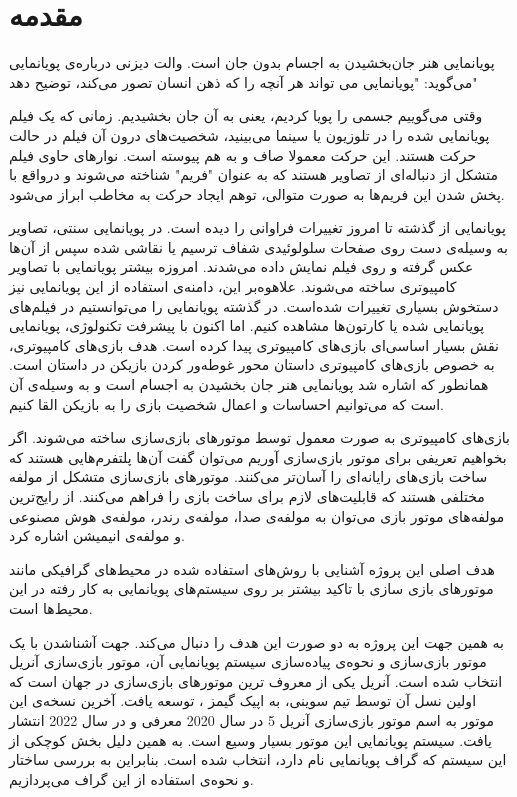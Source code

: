 \chapter{مقدمه}






پویانمایی هنر جان‌بخشیدن به اجسام بدون جان است.
والت دیزنی درباره‌‌ی پویانمایی می‌گوید: "پویانمایی می تواند هر آنچه را که ذهن انسان تصور می‌کند، توضیح دهد"

وقتی می‌گوییم جسمی را پویا کردیم، یعنی به آن جان بخشیدیم.
زمانی که یک فیلم پویانمایی شده را در تلوزیون یا سینما می‌بینید، شخصیت‌های درون آن فیلم در حالت حرکت هستند.
این حرکت معمولا صاف و به هم پیوسته است. نوارهای حاوی فیلم متشکل از دنباله‌ای از تصاویر هستند که به عنوان "فریم" شناخته می‌شوند و درواقع با پخش شدن این فریم‌ها
به صورت متوالی، توهم ایجاد حرکت به مخاطب ابراز می‌شود.

پویانمایی از گذشته تا امروز تغییرات فراوانی را دیده است.
در پویانمایی سنتی، تصاویر به وسیله‌‌ی دست روی صفحات سلولوئیدی شفاف ترسیم یا نقاشی شده 
سپس از آن‌ها عکس گرفته و روی فیلم نمایش داده می‌شدند.
امروزه بیشتر پویانمایی با تصاویر کامپیوتری
ساخته می‌شوند.
علاهوه‌بر این، دامنه‌ی استفاده از این پویانمایی نیز دستخوش بسیاری تغییرات شده‌است.
در گذشته پویانمایی را می‌توانستیم در فیلم‌های پویانمایی شده یا کارتون‌ها مشاهده کنیم.
اما اکنون با پیشرفت تکنولوژی، پویانمایی نقش بسیار اساسی‌ای بازی‌های کامپیوتری پیدا کرده است.
هدف بازی‌‌های کامپیوتری، به خصوص بازی‌های کامپیوتری داستان محور غوطه‌ور کردن بازیکن 
در داستان است.
همانطور که اشاره شد پویانمایی هنر جان بخشیدن به اجسام است و به وسیله‌ی 
آن است که می‌توانیم احساسات و اعمال شخصیت بازی را به بازیکن القا کنیم.

بازی‌های کامپیوتری به صورت معمول توسط موتور‌های بازی‌سازی ساخته می‌شوند.
اگر بخواهیم تعریفی برای موتور بازی‌سازی آوریم می‌توان گفت 
آن‌ها پلتفرم‌هایی هستند که ساخت بازی‌های رایانه‌ای را آسان‌تر می‌کنند.
موتور‌های بازی‌سازی متشکل از مولفه مختلفی هستند که قابلیت‌های لازم برای ساخت بازی را فراهم می‌کنند.
از رایج‌ترین مولفه‌های موتور بازی می‌توان به مولفه‌ی صدا، مولفه‌ی رندر، مولفه‌ی هوش مصنوعی و مولفه‌ی انیمیشن اشاره کرد.
\cite{barczak2019comparative}

هدف اصلی این پروژه آشنایی با روش‌های استفاده شده در محیط‌های گرافیکی مانند موتورهای بازی سازی با تاکید بیشتر بر 
روی سیستم‌های پویانمایی به کار رفته در این محیط‌ها است.

به همین جهت این پروژه به دو صورت این هدف را دنبال می‌کند.
جهت آشناشدن با یک موتور بازی‌سازی و نحوه‌ی پیاده‌سازی سیستم پویانمایی آن، موتور 
بازی‌سازی آنریل انتخاب شده است.
آنریل یکی از معروف ترین موتور‌های بازی‌سازی در جهان است که اولین نسل آن
توسط تیم سوینی، به اپیک گیمز 
، توسعه یافت.
آخرین نسخه‌ی این موتور به اسم موتور بازی‌سازی آنریل 5 
در سال 2020 معرفی و در سال 2022 انتشار یافت.
سیستم پویانمایی این موتور بسیار وسیع است. به همین دلیل بخش کوچکی از این سیستم که گراف پویانمایی نام دارد، انتخاب شده است.
بنابراین به بررسی ساختار و نحوه‌ی استفاده از این گراف می‌پردازیم.

